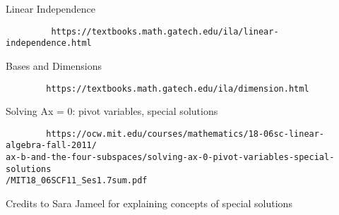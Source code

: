 \documentclass[a4paper, 11pt]{article}
\begin{document}
\newpage 

\begin{thebibliography}{}
		Linear Independence 
		\begin{verbatim}
		 https://textbooks.math.gatech.edu/ila/linear-independence.html
		\end{verbatim}
		Bases and Dimensions
		\begin{verbatim}
		https://textbooks.math.gatech.edu/ila/dimension.html	
		\end{verbatim}
		Solving Ax = 0: pivot variables, special solutions
		\begin{verbatim}
		https://ocw.mit.edu/courses/mathematics/18-06sc-linear-algebra-fall-2011/
ax-b-and-the-four-subspaces/solving-ax-0-pivot-variables-special-solutions
/MIT18_06SCF11_Ses1.7sum.pdf
		\end{verbatim}
		
		Credits to Sara Jameel for explaining concepts of special solutions 

\end{thebibliography}
\end{document}
